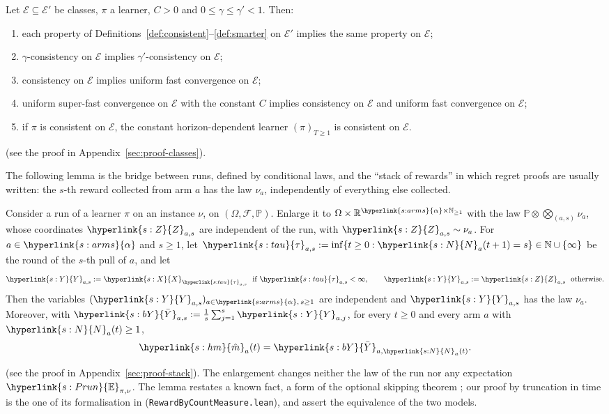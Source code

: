 \documentclass[11pt]{article}
\newcommand{\E}{\mathbb{E}}
\newcommand{\Prob}{\mathbb{P}}
\newcommand{\R}{\mathbb{R}}
\newcommand{\dt}[1]{\hypertarget{#1}{}}
\newcommand{\sy}[2]{{\hyperlink{#1}{#2}}}
\newcommand{\arms}{\sy{s:arms}{\alpha}}
\newcommand{\Xr}{\sy{s:X}{X}}
\newcommand{\Er}{\sy{s:Prun}{\E}}
\newcommand{\Np}{\sy{s:N}{N}}
\newcommand{\hm}{\sy{s:hm}{\hat{m}}}
\newcommand{\taup}{\sy{s:tau}{\tau}}
\newcommand{\Yc}{\sy{s:Y}{Y}}
\newcommand{\bY}{\sy{s:bY}{\bar{Y}}}
\newcommand{\Zc}{\sy{s:Z}{Z}}
\begin{document}
\begin{lemma}\label{lem:classes}
Let $\mathcal E\subseteq\mathcal E'$ be classes, $\pi$ a learner, $C>0$ and $0\le\gamma\le\gamma'<1$.
Then:
\begin{enumerate}[label=(\roman*)]
  \item each property of Definitions~\ref{def:consistent}--\ref{def:smarter} on $\mathcal E'$
  implies the same property on $\mathcal E$;
  \item $\gamma$-consistency on $\mathcal E$ implies $\gamma'$-consistency on $\mathcal E$;
  \item consistency on $\mathcal E$ implies uniform fast convergence on $\mathcal E$;
  \item uniform super-fast convergence on $\mathcal E$ with the constant $C$ implies consistency on
  $\mathcal E$ and uniform fast convergence on $\mathcal E$;
  \item if $\pi$ is consistent on $\mathcal E$, the constant horizon-dependent learner
  $(\pi)_{T\ge1}$ is consistent on $\mathcal E$.
\end{enumerate}
\end{lemma}
(see the proof in Appendix~\ref{sec:proof-classes}).

The following lemma is the bridge between runs, defined by conditional laws, and the ``stack of
rewards'' in which regret proofs are usually written: the $s$-th reward collected from arm $a$ has
the law $\nu_a$, independently of everything else collected.

\begin{lemma}\label{lem:stack}
Consider a run of a learner $\pi$ on an instance $\nu$, on $(\Omega,\mathcal F,\Prob)$. Enlarge it
to $\Omega\times\R^{\arms\times\mathbb N_{\ge1}}$ with the law $\Prob\otimes\bigotimes_{(a,s)}\nu_a$,
\dt{s:Z}whose coordinates $\Zc_{a,s}$ are independent of the run, with $\Zc_{a,s}\sim\nu_a$.
\dt{s:tau}For $a\in\arms$ and $s\ge1$, let $\taup_{a,s}:=\inf\{t\ge0:\Np_a(t+1)=s\}\in\mathbb N\cup\{\infty\}$
be the round of the $s$-th pull of $a$, and \dt{s:Y}let
\begin{equation*}
  \Yc_{a,s}:=\Xr_{\taup_{a,s}}\ \text{ if }\taup_{a,s}<\infty,\qquad\Yc_{a,s}:=\Zc_{a,s}\ \text{ otherwise}.
\end{equation*}
Then the variables $(\Yc_{a,s})_{a\in\arms,\,s\ge1}$ are independent and $\Yc_{a,s}$ has the law $\nu_a$.
Moreover, \dt{s:bY}with $\bY_{a,s}:=\frac1s\sum_{j=1}^s\Yc_{a,j}$, for every $t\ge0$ and every arm $a$
with $\Np_a(t)\ge1$,
\begin{equation*}
  \hm_a(t)=\bY_{a,\Np_a(t)}.
\end{equation*}
\end{lemma}
(see the proof in Appendix~\ref{sec:proof-stack}). The enlargement changes neither the law of the
run nor any expectation $\Er_{\pi,\nu}$. The lemma restates a known fact, a form of the optional
skipping theorem \citep[see also][]{D36}; our proof by truncation in time is the one of its
formalisation in \citet{LML} (\texttt{RewardByCountMeasure.lean}), and \citet[Section~4.6]{LS}
assert the equivalence of the two models.
\end{document}

